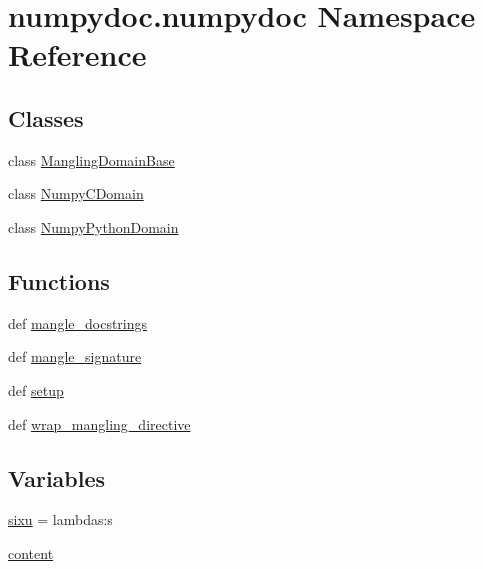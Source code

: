 \hypertarget{namespacenumpydoc_1_1numpydoc}{}\section{numpydoc.\+numpydoc Namespace Reference}
\label{namespacenumpydoc_1_1numpydoc}
\subsection*{Classes}
\begin{DoxyCompactItemize}
\item 
class \hyperlink{classnumpydoc_1_1numpydoc_1_1ManglingDomainBase}{Mangling\+Domain\+Base}
\item 
class \hyperlink{classnumpydoc_1_1numpydoc_1_1NumpyCDomain}{Numpy\+C\+Domain}
\item 
class \hyperlink{classnumpydoc_1_1numpydoc_1_1NumpyPythonDomain}{Numpy\+Python\+Domain}
\end{DoxyCompactItemize}
\subsection*{Functions}
\begin{DoxyCompactItemize}
\item 
def \hyperlink{namespacenumpydoc_1_1numpydoc_a753708c51097aacc897302d264e1d1c9}{mangle\+\_\+docstrings}
\item 
def \hyperlink{namespacenumpydoc_1_1numpydoc_a2a04e3faab6919a0dc9bff9b7c0fe8d6}{mangle\+\_\+signature}
\item 
def \hyperlink{namespacenumpydoc_1_1numpydoc_a6227ce592b57924e7fbd3e5efdad2974}{setup}
\item 
def \hyperlink{namespacenumpydoc_1_1numpydoc_af313526a1387fcbdc45a1a69537afda7}{wrap\+\_\+mangling\+\_\+directive}
\end{DoxyCompactItemize}
\subsection*{Variables}
\begin{DoxyCompactItemize}
\item 
\hyperlink{namespacenumpydoc_1_1numpydoc_a55f739eb45c34ad39e91eefc96fe8cdc}{sixu} = lambdas\+:s
\item 
\hyperlink{namespacenumpydoc_1_1numpydoc_a0bce04ee9930d54ea185492a936a1248}{content}
\end{DoxyCompactItemize}


